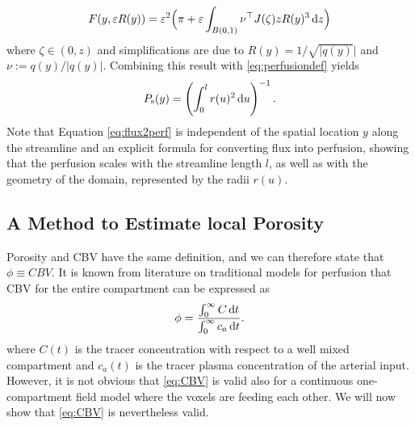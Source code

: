 \documentclass[journal,twocolumn]{IEEEtran}
\newcommand{\Perfs}{P_{\mathrm{s}}}
\begin{document}
	\begin{equation}
		F(y,\varepsilon R(y))
		= \varepsilon^2 \Big(\pi + \varepsilon \int_{B(0,1)} \nu^\top J(\zeta)zR(y)^3 \,\mathrm{d} z\Big)
	\end{equation}
	where $\zeta \in (0,z)$ and simplifications are due to $R(y) = 1/\sqrt{\vert q(y)} \vert$ and $\nu:=q(y)/\vert q(y) \vert$.
	Combining this result with \eqref{eq:perfusiondef} yields
	\begin{equation}\label{eq:flux2perf}
		\Perfs(y) = \left(\int_0^l r(u)^2 \diffint u\right)^{-1}.
	\end{equation}
	Note that Equation \eqref{eq:flux2perf} is independent of the spatial location $y$ along the streamline and an explicit formula for converting flux into perfusion, showing that the perfusion scales with the streamline length $l$, as well as with the geometry of the domain, represented by the radii $r(u)$.
	

	\subsection{A Method to Estimate local Porosity}\label{sec:CBV}
	
	Porosity and CBV have the same definition, and we can therefore state that $\phi \equiv CBV$. It is known from literature on traditional models \cite{sourbron13} for perfusion that CBV for the entire compartment can be expressed as
	\begin{equation}
		\phi = \frac{\int_0^\infty C \diffint t}{\int_0^\infty c_a \diffint t}.
		\label{eq:CBV}
	\end{equation}
	where $C(t)$ is the tracer concentration with respect to a well mixed compartment and $c_a(t)$ is the tracer plasma concentration of the arterial input. 
	However, it is not obvious that \eqref{eq:CBV} is valid also for a continuous one-compartment field model where the voxels are feeding each other. We will now show that \eqref{eq:CBV} is nevertheless valid.
	
\end{document}
